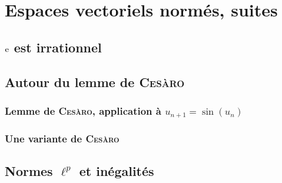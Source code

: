 \chapter{Espaces vectoriels normés, suites}

\section{\texorpdfstring{$\mathrm{e}$}{e} est irrationnel}


\section{Autour du lemme de \textsc{Cesàro}}

\subsection{Lemme de \textsc{Cesàro}, application à \texorpdfstring{$u_{n+1}=\sin(u_n)$}{u_n+1 = sin(u_n)}}


\subsection{Une variante de \textsc{Cesàro}} \label{variante_cesaro}


\section{Normes \texorpdfstring{$\ell^p$}{l^p} et inégalités} \label{normes_lp_et_inegalites}



